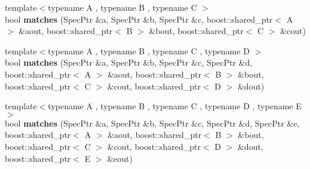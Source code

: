 \begin{DoxyCompactItemize}
\item 
\hypertarget{namespacegiskard__suturo_a78e80a5106001779fceaa1a312d82d3a}{{\footnotesize template$<$typename A , typename B , typename C $>$ }\\bool {\bfseries matches} (Spec\-Ptr \&a, Spec\-Ptr \&b, Spec\-Ptr \&c, boost\-::shared\-\_\-ptr$<$ A $>$ \&aout, boost\-::shared\-\_\-ptr$<$ B $>$ \&bout, boost\-::shared\-\_\-ptr$<$ C $>$ \&cout)}\label{namespacegiskard__suturo_a78e80a5106001779fceaa1a312d82d3a}

\item 
\hypertarget{namespacegiskard__suturo_a0df1ce92e0bc2547b418cf93c4ae69b6}{{\footnotesize template$<$typename A , typename B , typename C , typename D $>$ }\\bool {\bfseries matches} (Spec\-Ptr \&a, Spec\-Ptr \&b, Spec\-Ptr \&c, Spec\-Ptr \&d, boost\-::shared\-\_\-ptr$<$ A $>$ \&aout, boost\-::shared\-\_\-ptr$<$ B $>$ \&bout, boost\-::shared\-\_\-ptr$<$ C $>$ \&cout, boost\-::shared\-\_\-ptr$<$ D $>$ \&dout)}\label{namespacegiskard__suturo_a0df1ce92e0bc2547b418cf93c4ae69b6}

\item 
\hypertarget{namespacegiskard__suturo_a84dd836a62df292bc578a5542977b31c}{{\footnotesize template$<$typename A , typename B , typename C , typename D , typename E $>$ }\\bool {\bfseries matches} (Spec\-Ptr \&a, Spec\-Ptr \&b, Spec\-Ptr \&c, Spec\-Ptr \&d, Spec\-Ptr \&e, boost\-::shared\-\_\-ptr$<$ A $>$ \&aout, boost\-::shared\-\_\-ptr$<$ B $>$ \&bout, boost\-::shared\-\_\-ptr$<$ C $>$ \&cout, boost\-::shared\-\_\-ptr$<$ D $>$ \&dout, boost\-::shared\-\_\-ptr$<$ E $>$ \&eout)}\label{namespacegiskard__suturo_a84dd836a62df292bc578a5542977b31c}


\end{DoxyCompactItemize}
